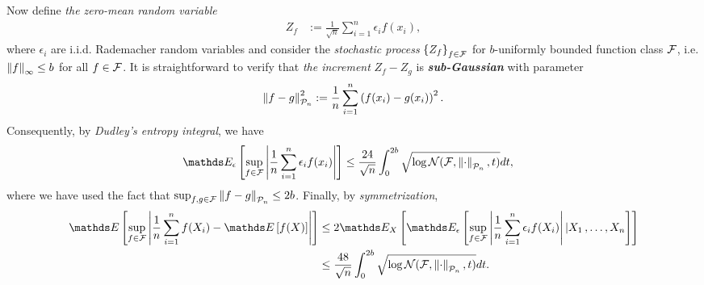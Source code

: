 \documentclass[11pt]{article}
\begin{document}
\begin{itemize}
\begin{remark}
Now define \emph{the zero-mean random variable} 
\begin{align*}
Z_f &:= \frac{1}{\sqrt{n}}\sum_{i=1}^n \epsilon_i f(x_i),
\end{align*} where $\epsilon_i$ are i.i.d. Rademacher random variables and consider the \emph{stochastic process} $\left\{Z_f\right\}_{ f \in {\mathcal F}}$ for $b$-uniformly bounded function class ${\mathcal F}$, i.e. $\left\|f\right\|_{\infty} \le b$ for all $f \in {\mathcal F}$. It is straightforward to verify that \emph{the increment} $Z_f - Z_g$ is \emph{\textbf{sub-Gaussian}} with parameter
\begin{align*}
\left\|f - g\right\|_{{\mathcal P}_n}^2 := \frac{1}{n}\sum_{i=1}^n\left(f(x_i) - g(x_i)\right)^2.
\end{align*}
Consequently, by \emph{Dudley's entropy integral}, we have
\begin{align}
\E{\epsilon}{\sup_{f\in \cF}\abs{\frac{1}{n}\sum_{i=1}^n \epsilon_i f(x_i) }} &\le \frac{24}{\sqrt{n}}\int_{0}^{2b}\sqrt{\log \cN(\cF, \norm{\cdot}{\cP_n}, t)} dt, \label{ineqn: dudley_metric_entropy_Rademacher_process}
\end{align}
where we have used the fact that $\sup_{f, g \in {\mathcal F}}\left\|f - g\right\|_{{\mathcal P}_n} \le 2b$. Finally, by \emph{symmetrization}, 
\begin{align}
\E{}{\sup_{f \in \cF}\abs{\frac{1}{n}\sum_{i=1}^{n}f(X_i) - \E{}{f(X)}}} &\le 2 \E{X}{\E{\epsilon}{\sup_{f\in \cF}\abs{\frac{1}{n}\sum_{i=1}^n \epsilon_i f(X_i) }| X_1 \xdotx{,} X_n}} \nonumber\\
&\le \frac{48}{\sqrt{n}}\int_{0}^{2b}\sqrt{\log \cN(\cF, \norm{\cdot}{\cP_n}, t)} dt. \label{ineqn: dudley_metric_entropy_emp_process}
\end{align}
\end{remark}
\end{itemize}
\end{document}

